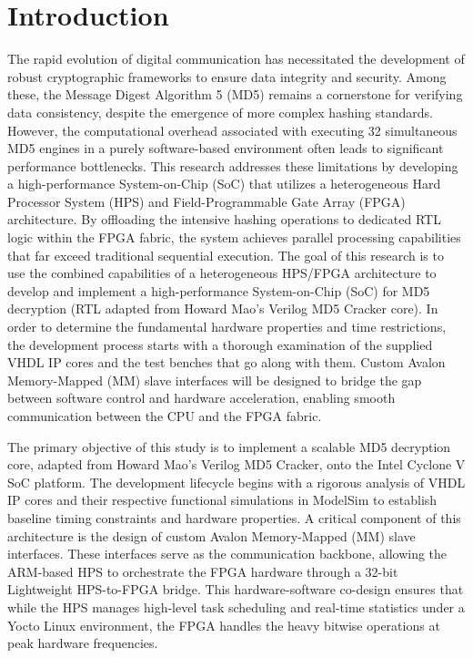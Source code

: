 \documentclass[conference]{IEEEtran}
\begin{document}
\section{Introduction}
The rapid evolution of digital communication has necessitated the development of robust cryptographic frameworks to ensure data integrity and security. Among these, the Message Digest Algorithm 5 (MD5) remains a cornerstone for verifying data consistency, despite the emergence of more complex hashing standards. However, the computational overhead associated with executing 32 simultaneous MD5 engines in a purely software-based environment often leads to significant performance bottlenecks. This research addresses these limitations by developing a high-performance System-on-Chip (SoC) that utilizes a heterogeneous Hard Processor System (HPS) and Field-Programmable Gate Array (FPGA) architecture. By offloading the intensive hashing operations to dedicated RTL logic within the FPGA fabric, the system achieves parallel processing capabilities that far exceed traditional sequential execution.
The goal of this research is to use the combined capabilities of a heterogeneous HPS/FPGA architecture to develop and implement a high-performance System-on-Chip (SoC) for MD5 decryption (RTL adapted from Howard Mao's Verilog MD5 Cracker core). In order to determine the fundamental hardware properties and time restrictions, the development process starts with a thorough examination of the supplied VHDL IP cores and the test benches that go along with them. Custom Avalon Memory-Mapped (MM) slave interfaces will be designed to bridge the gap between software control and hardware acceleration, enabling smooth communication between the CPU and the FPGA fabric.

The primary objective of this study is to implement a scalable MD5 decryption core, adapted from Howard Mao's Verilog MD5 Cracker, onto the Intel Cyclone V SoC platform. The development lifecycle begins with a rigorous analysis of VHDL IP cores and their respective functional simulations in ModelSim to establish baseline timing constraints and hardware properties. A critical component of this architecture is the design of custom Avalon Memory-Mapped (MM) slave interfaces. These interfaces serve as the communication backbone, allowing the ARM-based HPS to orchestrate the FPGA hardware through a 32-bit Lightweight HPS-to-FPGA bridge. This hardware-software co-design ensures that while the HPS manages high-level task scheduling and real-time statistics under a Yocto Linux environment, the FPGA handles the heavy bitwise operations at peak hardware frequencies.
\end{document}
